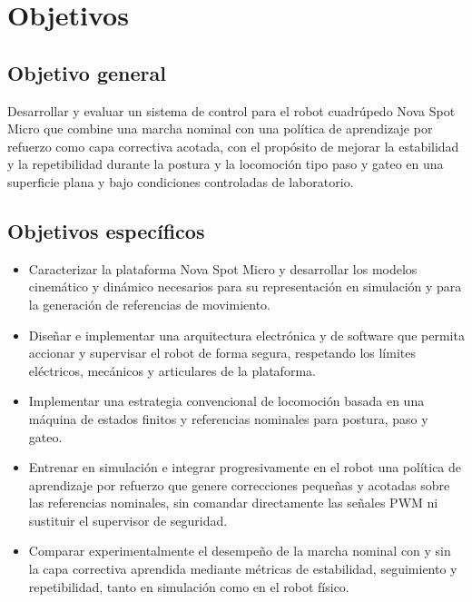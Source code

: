 
\chapter{Objetivos}

\section{Objetivo general}

Desarrollar y evaluar un sistema de control para el robot cuadrúpedo Nova Spot
Micro que combine una marcha nominal con una política de aprendizaje por
refuerzo como capa correctiva acotada, con el propósito de mejorar la
estabilidad y la repetibilidad durante la postura y la locomoción tipo paso y
gateo en una superficie plana y bajo condiciones controladas de laboratorio.


\section{Objetivos específicos}


\begin{itemize}

\item Caracterizar la plataforma Nova Spot Micro y desarrollar los modelos
cinemático y dinámico necesarios para su representación en simulación y para la
generación de referencias de movimiento.

\item Diseñar e implementar una arquitectura electrónica y de software que
permita accionar y supervisar el robot de forma segura, respetando los límites
eléctricos, mecánicos y articulares de la plataforma.

\item Implementar una estrategia convencional de locomoción basada en una
máquina de estados finitos y referencias nominales para postura, paso y gateo.

\item Entrenar en simulación e integrar progresivamente en el robot una política
de aprendizaje por refuerzo que genere correcciones pequeñas y acotadas sobre
las referencias nominales, sin comandar directamente las señales PWM ni
sustituir el supervisor de seguridad.

\item Comparar experimentalmente el desempeño de la marcha nominal con y sin la
capa correctiva aprendida mediante métricas de estabilidad, seguimiento y
repetibilidad, tanto en simulación como en el robot físico.

\end{itemize}
